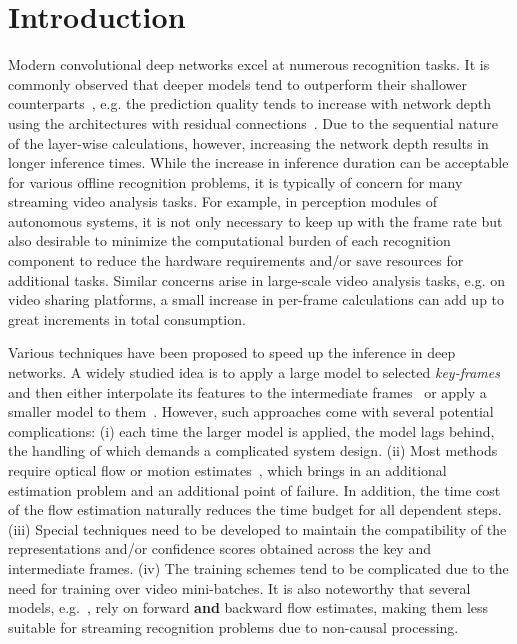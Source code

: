 \documentclass[runningheads]{llncs}
\begin{document}
\section{Introduction}\label{sec:intro}


Modern convolutional deep networks excel at numerous recognition tasks. It is commonly observed that deeper models tend to outperform their shallower counterparts~\cite{he2016deep,huang2017densely,zagoruyko2016wide}, e.g. the prediction quality tends to increase with network depth using the architectures with residual connections~\cite{he2016deep}. Due to the sequential nature of the layer-wise calculations, however, increasing the network depth results in longer inference times. While the increase in inference duration can be acceptable for various offline recognition problems, it is typically of concern for many streaming video analysis tasks. For example, in perception modules of autonomous systems, it is not only necessary to keep up with the frame rate but also desirable to minimize the computational burden of each recognition component to reduce the hardware requirements and/or save resources for additional tasks. Similar concerns arise in large-scale video analysis tasks, e.g. on video sharing platforms, a small increase in per-frame calculations can add up to great increments in total consumption. 



Various techniques have been proposed to speed up the inference in deep networks. A widely studied idea is to apply a large model to selected {\em key-frames} and then either interpolate its features to the intermediate frames~\cite{zhu2017dff,zhu2018towards} or apply a smaller model to them~\cite{xu2018dynamic,liu2019looking}. However, such approaches come with several potential complications: (i) each time the larger model is applied, the model lags behind, the handling of which demands a complicated system design. (ii) Most methods require optical flow or motion estimates~\cite{zhu2017dff,zhu2018towards}, which brings in an additional estimation problem and an additional point of failure. In addition, the time cost of the flow estimation naturally reduces the time budget for all dependent steps. (iii) Special techniques need to be developed to maintain the compatibility of the representations and/or confidence scores obtained across the key and intermediate frames. (iv) The training schemes tend to be complicated due to the need for training over video mini-batches. It is also noteworthy that several models, e.g.~\cite{kang2017tubelets,wang2018manet}, rely on forward \textbf{and} backward flow estimates, making them less suitable for streaming recognition problems due to non-causal processing.
\end{document}
